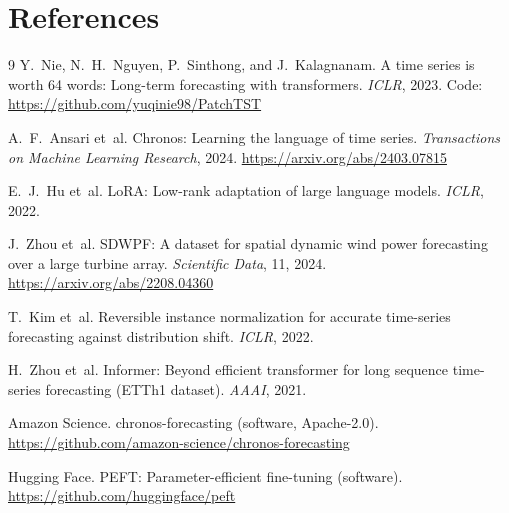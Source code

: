 \documentclass[11pt]{article}
\begin{document}
\section*{References}
{\renewcommand{\section}[2]{}%
\footnotesize
\begin{thebibliography}{9}
Y.~Nie, N.~H.~Nguyen, P.~Sinthong, and J.~Kalagnanam.
\newblock A time series is worth 64 words: Long-term forecasting with transformers.
\newblock \emph{ICLR}, 2023. Code: \url{https://github.com/yuqinie98/PatchTST}

A.~F.~Ansari et~al.
\newblock Chronos: Learning the language of time series.
\newblock \emph{Transactions on Machine Learning Research}, 2024. \url{https://arxiv.org/abs/2403.07815}

E.~J.~Hu et~al.
\newblock LoRA: Low-rank adaptation of large language models.
\newblock \emph{ICLR}, 2022.

J.~Zhou et~al.
\newblock SDWPF: A dataset for spatial dynamic wind power forecasting over a large turbine array.
\newblock \emph{Scientific Data}, 11, 2024. \url{https://arxiv.org/abs/2208.04360}

T.~Kim et~al.
\newblock Reversible instance normalization for accurate time-series forecasting against distribution shift.
\newblock \emph{ICLR}, 2022.

H.~Zhou et~al.
\newblock Informer: Beyond efficient transformer for long sequence time-series forecasting (ETTh1 dataset).
\newblock \emph{AAAI}, 2021.

Amazon Science.
\newblock chronos-forecasting (software, Apache-2.0).
\newblock \url{https://github.com/amazon-science/chronos-forecasting}

Hugging Face.
\newblock PEFT: Parameter-efficient fine-tuning (software).
\newblock \url{https://github.com/huggingface/peft}

\end{thebibliography}}
\end{document}
